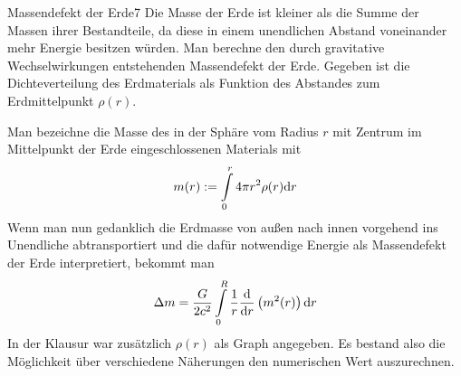 \begin{problem}{Massendefekt der Erde}{7}
Die Masse der Erde ist kleiner als die Summe der Massen ihrer Bestandteile, da diese in einem unendlichen Abstand voneinander mehr Energie besitzen würden. Man berechne den durch gravitative Wechselwirkungen entstehenden Massendefekt der Erde. Gegeben ist die Dichteverteilung des Erdmaterials als Funktion des Abstandes zum Erdmittelpunkt $\rho(r)$.

\begin{solution}
Man bezeichne die Masse des in der Sphäre vom Radius $r$ mit Zentrum im Mittelpunkt der Erde eingeschlossenen Materials mit
\[
m(r) := \int\limits_0^r 4\pi r^2 \rho(r) \mathrm{d} r
\]
Wenn man nun gedanklich die Erdmasse von außen nach innen vorgehend ins Unendliche abtransportiert und die dafür notwendige Energie als Massendefekt der Erde interpretiert, bekommt man
\[
\Delta m = \frac{G}{2 c^2} \int\limits_{0}^{R} \frac1r \frac{\mathrm{d}}{\mathrm{d} r} \left( m^2(r) \right) \mathrm{d} r
\]
In der Klausur war zusätzlich $\rho(r)$ als Graph angegeben. Es bestand also die Möglichkeit über verschiedene Näherungen den numerischen Wert auszurechnen.
\end{solution}

\end{problem}


